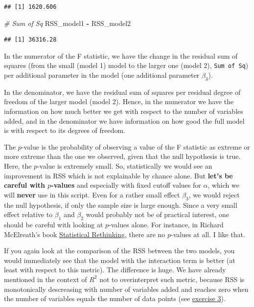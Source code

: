 \documentclass[
]{book}
\newenvironment{Shaded}{\begin{snugshade}}{\end{snugshade}}
\newcommand{\CommentTok}[1]{\textcolor[rgb]{0.56,0.35,0.01}{\textit{#1}}}
\newcommand{\NormalTok}[1]{#1}
\newcommand{\SpecialCharTok}[1]{\textcolor[rgb]{0.81,0.36,0.00}{\textbf{#1}}}
\begin{document}
\begin{verbatim}
## [1] 1620.606
\end{verbatim}

\begin{Shaded}
\begin{Highlighting}[]
\CommentTok{\# Sum of Sq}
\NormalTok{RSS\_model1 }\SpecialCharTok{{-}}\NormalTok{ RSS\_model2}
\end{Highlighting}
\end{Shaded}

\begin{verbatim}
## [1] 36316.28
\end{verbatim}

In the numerator of the F statistic, we have the change in the residual sum of squares
(from the small (model 1) model to the larger one (model 2), \texttt{Sum\ of\ Sq})
per additional parameter in the model (one additional parameter \(\beta_3\)).

In the denominator, we have the residual sum of squares per residual degree of freedom of
the larger model (model 2). Hence, in the numerator we have the information on how much
better we get with respect to the number of variables added, and in the denominator
we have information on how good the full model is with respect to its degrees of freedom.

The \(p\)-value is the probability of observing a value of the F statistic as extreme or more
extreme than the one we observed, given that the null hypothesis is true. Here,
the \(p\)-value is extremely small. So, statistically we would see an improvement in RSS
which is not explainable by chance alone.
But \textbf{let's be careful with \(p\)-values} and especially with fixed cutoff values for \(\alpha\),
which we will \textbf{never} use in this script.
Even for a rather small effect \(\beta_3\), we would reject the null hypothesis, if only the sample
size is large enough. Since a very small effect relative to \(\beta_1\) and \(\beta_2\) would
probably not be of practical interest, one should be careful with looking at \(p\)-values alone.
For instance, in Richard McElreath's book \href{https://xcelab.net/rm/statistical-rethinking/}{Statistical Rethinking},
there are no \(p\)-values at all. I like that.

If you again look at the comparison of the RSS between the two models, you would
immediately see that the model with the interaction term is better (at least with respect to this metric).
The difference is huge. We have already mentioned in the context of \(R^2\) not to overinterpret
such metric, because RSS is monotonically descreasing with number of variables added and reaches
zero when the number of variables equals the number of data points (see \hyperref[exercise3_multiple_regression]{exercise 3}).
\end{document}
